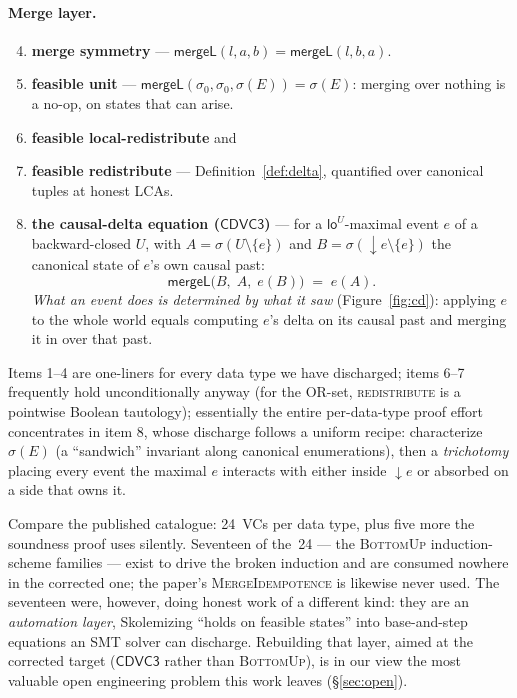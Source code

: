 \documentclass[11pt]{article}
\newcommand{\mergeL}{\mathsf{mergeL}}
\newcommand{\Sinit}{\sigma_0}
\newcommand{\loE}[1]{\mathsf{lo}^{#1}}
\newcommand{\dow}[1]{{\downarrow}#1}
\newcommand{\cd}{\mathsf{CDVC3}}
\begin{document}
\paragraph{Merge layer.}
\begin{enumerate}[leftmargin=2.2em]\setcounter{enumi}{3}
\item \textbf{merge symmetry} --- $\mergeL(l,a,b) = \mergeL(l,b,a)$.
\item \textbf{feasible unit} --- $\mergeL(\Sinit,\Sinit,\sigma(E)) =
  \sigma(E)$: merging over nothing is a no-op, on states that can arise.
\item \textbf{feasible local-redistribute} and
\item \textbf{feasible redistribute} --- Definition~\ref{def:delta},
  quantified over canonical tuples at honest LCAs.
\item \textbf{the causal-delta equation ($\cd$)} --- for a
  $\loE{U}$-maximal event $e$ of a backward-closed $U$, with
  $A = \sigma(U\setminus\{e\})$ and $B = \sigma(\dow{e}\setminus\{e\})$
  the canonical state of $e$'s own causal past:
  \[
    \mergeL\bigl(B,\; A,\; e(B)\bigr) \;=\; e(A).
  \]
  \emph{What an event does is determined by what it saw}
  (Figure~\ref{fig:cd}): applying $e$ to the whole world equals computing
  $e$'s delta on its causal past and merging it in over that past.
\end{enumerate}

Items 1--4 are one-liners for every data type we have discharged; items
6--7 frequently hold unconditionally anyway (for the OR-set,
\textsc{redistribute} is a pointwise Boolean tautology); essentially the
entire per-data-type proof effort concentrates in item 8, whose discharge
follows a uniform recipe: characterize $\sigma(E)$ (a ``sandwich''
invariant along canonical enumerations), then a \emph{trichotomy} placing
every event the maximal $e$ interacts with either inside $\dow{e}$ or
absorbed on a side that owns it.

Compare the published catalogue: 24~VCs per data type, plus five more the
soundness proof uses silently. Seventeen of the~24 --- the
\textsc{BottomUp} induction-scheme families --- exist to drive the broken
induction and are consumed nowhere in the corrected one; the paper's
\textsc{MergeIdempotence} is likewise never used. The seventeen were,
however, doing honest work of a different kind: they are an
\emph{automation layer}, Skolemizing ``holds on feasible states'' into
base-and-step equations an SMT solver can discharge. Rebuilding that
layer, aimed at the corrected target ($\cd$ rather than \textsc{BottomUp}),
is in our view the most valuable open engineering problem this work
leaves (\S\ref{sec:open}).
\end{document}
